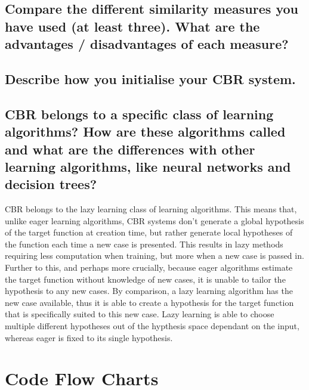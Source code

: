\documentclass[11pt]{article}
\begin{document}
\subsection{Compare the different similarity measures you have used (at least three). What are the advantages / disadvantages of each measure?}

\subsection{Describe how you initialise your CBR system.}

\subsection{CBR belongs to a specific class of learning algorithms? How are these algorithms called and what are the differences with other learning algorithms, like neural networks and decision trees?}

CBR belongs to the lazy learning class of learning algorithms. This means that, unlike eager
learning algorithms, CBR systems don't generate a global hypothesis of the target function at
creation time, but rather generate local hypotheses of the function each time a new case is
presented. This results in lazy methods requiring less computation when training, but more
when a new case is passed in. Further to this, and perhaps more crucially, because eager
algorithms estimate the target function without knowledge of new cases, it is unable to tailor
the hypothesis to any new cases. By comparison, a lazy learning algorithm has the new case
available, thus it is able to create a hypothesis for the target function that is specifically
suited to this new case. Lazy learning is able to choose multiple different hypotheses out of
the hypthesis space dependant on the input, whereas eager is fixed to its single hypothesis.


\section{Code Flow Charts}
\end{document}
